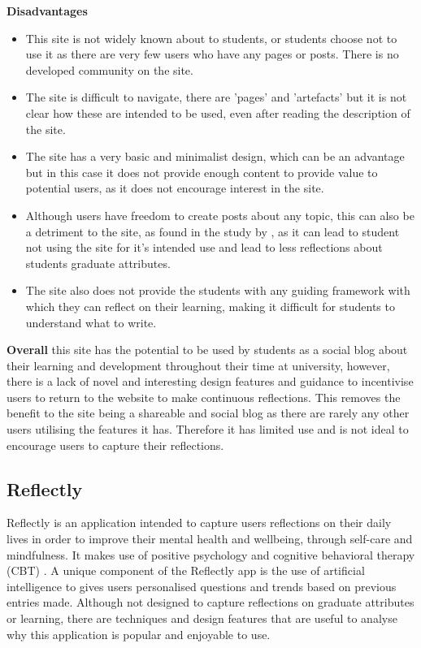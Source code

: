 \documentclass{l4proj}
\begin{document}
\textbf{Disadvantages}
\begin{itemize}
    \item This site is not widely known about to students, or students choose not to use it as there are very few users who have any pages or posts. There is
    no developed community on the site.
    \item The site is difficult to navigate, there are 'pages' and 'artefacts' but it is not clear how these are intended to be used, even after reading the 
    description of the site. 
    \item The site has a very basic and minimalist design, which can be an advantage but in this case it does not provide enough content to provide value
    to potential users, as it does not encourage interest in the site.
    \item Although users have freedom to create posts about any topic, this can also be a detriment to the site, as found in the study by 
    \citet{mcdermott_developing_nodate}, as it can lead to student not using the site for it's intended use and lead to less reflections about students graduate 
    attributes.
    \item The site also does not provide the students with any guiding framework with which they can reflect on their learning, making it difficult for students
    to understand what to write.
\end{itemize}

\textbf{Overall} this site has the potential to be used by students as a social blog about their learning and development throughout their time at university,
however, there is a lack of novel and interesting design features and guidance to incentivise users to return to the website to make continuous reflections.
This removes the benefit to the site being a shareable and social blog as there are rarely any other users utilising the features it has. Therefore it has
limited use and is not ideal to encourage users to capture their reflections.

\subsection{Reflectly}

Reflectly is an application intended to capture users reflections on their daily lives in order to improve their mental health and wellbeing, through self-care
and mindfulness. It makes use of positive psychology and cognitive behavioral therapy (CBT) \citep{reflectly_app}. 
A unique component of the Reflectly app is the use of artificial intelligence to gives users personalised questions and trends based on previous entries made.
Although not designed to capture reflections on graduate attributes or learning, there are techniques and design features that are useful to analyse why this
application is popular and enjoyable to use. 
\end{document}
